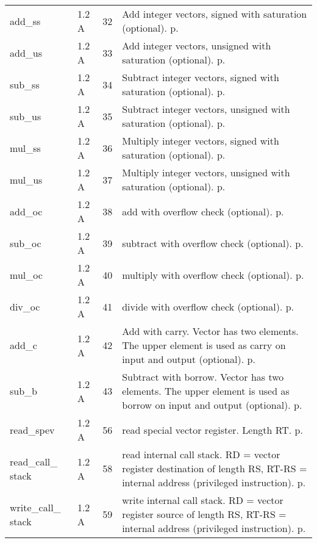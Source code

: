 \documentclass[forwardcom.tex]{subfiles}
\begin{document}
\begin{longtable} {|p{25mm}|p{14mm}|p{10mm}|p{95mm}|}
add\_ss       & 1.2 A & 32 & Add integer vectors, signed with saturation (optional). p. \pageref{table:addSsInstruction} \\
add\_us       & 1.2 A & 33 & Add integer vectors, unsigned with saturation (optional). p. \pageref{table:addUsInstruction} \\
sub\_ss       & 1.2 A & 34 & Subtract integer vectors, signed with saturation (optional). p. \pageref{table:subSsInstruction} \\
sub\_us       & 1.2 A & 35 & Subtract integer vectors, unsigned with saturation (optional). p. \pageref{table:addUsInstruction} \\
mul\_ss       & 1.2 A & 36 & Multiply integer vectors, signed with saturation (optional). p. \pageref{table:mulSsInstruction} \\
mul\_us       & 1.2 A & 37 & Multiply integer vectors, unsigned with saturation (optional). p. \pageref{table:mulUsInstruction} \\
add\_oc       & 1.2 A & 38 & add with overflow check (optional). p. \pageref{table:addOcInstruction} \\
sub\_oc       & 1.2 A & 39 & subtract with overflow check (optional). p. \pageref{table:subOcInstruction} \\
mul\_oc       & 1.2 A & 40 & multiply with overflow check (optional). p. \pageref{table:mulOcInstruction} \\
div\_oc       & 1.2 A & 41 & divide with overflow check (optional). p. \pageref{table:divOcInstruction} \\
add\_c        & 1.2 A & 42 & Add with carry. Vector has two elements. The upper element is used as carry on input and output (optional). p. \pageref{table:addCInstruction} \\
sub\_b        & 1.2 A & 43 & Subtract with borrow. Vector has two elements. The upper element is used as borrow on input and output (optional). p. \pageref{table:subBInstruction} \\

read\_spev    & 1.2 A & 56 & read special vector register. Length RT. p. \pageref{table:readSpevInstruction} \\
read\_call\_ stack & 1.2 A & 58 & read internal call stack. RD = vector register destination of length RS, RT-RS = internal address (privileged instruction). p. \pageref{table:readCallStackInstruction} \\
write\_call\_ stack & 1.2 A & 59 & write internal call stack. RD = vector register source of length RS, RT-RS = internal address (privileged instruction). p. \pageref{table:readCallStackInstruction} \\


\end{longtable}
\end{document}
